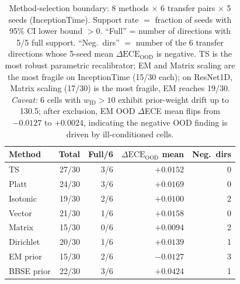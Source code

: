 \documentclass[review,12pt,nonatbib]{elsarticle}
\begin{document}
\begin{table}[t]
\centering
\caption{Method-selection boundary: 8 methods $\times$ 6 transfer pairs
$\times$ 5 seeds (InceptionTime). Support rate $=$ fraction of seeds
with 95\% CI lower bound $>0$. ``Full'' = number of directions with
5/5 full support. ``Neg.\ dirs'' $=$ number of the 6 transfer
directions whose 5-seed mean $\Delta\text{ECE}_{\text{OOD}}$ is
negative. TS is the most robust parametric recalibrator;
EM and Matrix scaling are the most fragile on InceptionTime
(15/30 each); on ResNet1D, Matrix scaling (17/30) is the most
fragile, EM reaches 19/30. \textit{Caveat:} 6 cells with
$w_{\text{ID}} > 10$ exhibit prior-weight drift up to 130.5; after
exclusion, EM OOD $\Delta$ECE mean flips from $-0.0127$ to $+0.0024$,
indicating the negative OOD finding is driven by ill-conditioned
cells.}
\label{tab:methods}
\footnotesize
\begin{tabular}{lrrrr}
\toprule
Method & Total & Full/6 & $\Delta\text{ECE}_{\text{OOD}}$ mean & Neg.\ dirs \\
\midrule
TS         & 27/30 & 3/6 & $+0.0152$ & 0 \\
Platt      & 24/30 & 3/6 & $+0.0169$ & 0 \\
Isotonic   & 19/30 & 2/6 & $+0.0100$ & 2 \\
Vector     & 21/30 & 1/6 & $+0.0158$ & 0 \\
Matrix     & 15/30 & 0/6 & $+0.0094$ & 2 \\
Dirichlet  & 20/30 & 1/6 & $+0.0139$ & 1 \\
EM prior   & 15/30 & 2/6 & $-0.0127$ & 3 \\
BBSE prior & 22/30 & 3/6 & $+0.0424$ & 1 \\
\bottomrule
\end{tabular}
\end{table}
\end{document}
